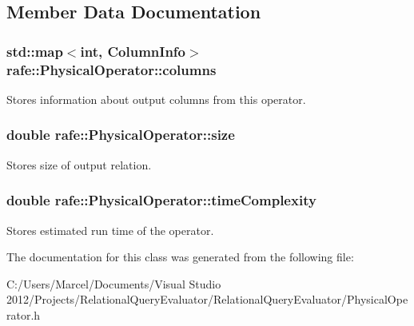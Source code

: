 \subsection{Member Data Documentation}
\hypertarget{classrafe_1_1_physical_operator_a4056113435af85657e5b61d397db5165}{
\subsubsection[{columns}]{\setlength{\rightskip}{0pt plus 5cm}std\+::map$<$int, {\bf Column\+Info}$>$ rafe\+::\+Physical\+Operator\+::columns}}\label{classrafe_1_1_physical_operator_a4056113435af85657e5b61d397db5165}
Stores information about output columns from this operator. \hypertarget{classrafe_1_1_physical_operator_a91df60e6935353504d02b9534a16eb4c}{
\subsubsection[{size}]{\setlength{\rightskip}{0pt plus 5cm}double rafe\+::\+Physical\+Operator\+::size}}\label{classrafe_1_1_physical_operator_a91df60e6935353504d02b9534a16eb4c}
Stores size of output relation. \hypertarget{classrafe_1_1_physical_operator_a7b1bec2ef31be7b9c85ab32f543e23af}{
\subsubsection[{time\+Complexity}]{\setlength{\rightskip}{0pt plus 5cm}double rafe\+::\+Physical\+Operator\+::time\+Complexity}}\label{classrafe_1_1_physical_operator_a7b1bec2ef31be7b9c85ab32f543e23af}
Stores estimated run time of the operator. 

The documentation for this class was generated from the following file\+:\begin{DoxyCompactItemize}
\item 
C\+:/\+Users/\+Marcel/\+Documents/\+Visual Studio 2012/\+Projects/\+Relational\+Query\+Evaluator/\+Relational\+Query\+Evaluator/Physical\+Operator.\+h\end{DoxyCompactItemize}
